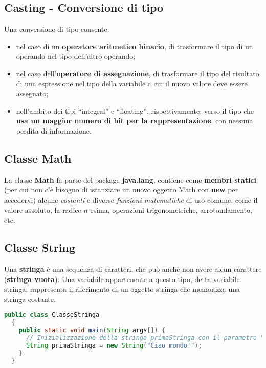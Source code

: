 \documentclass[a4paper]{extarticle}
\begin{document}
\subsection{Casting - Conversione di tipo}
Una conversione di tipo consente:
\begin{itemize}
  \item nel caso di un \textbf{operatore aritmetico binario}, di trasformare il tipo di un operando nel tipo dell’altro operando;
  \item nel caso dell’\textbf{operatore di assegnazione}, di trasformare il tipo del risultato di una espressione nel tipo della variabile a cui il nuovo valore deve essere assegnato;
  \item nell’ambito dei tipi “integral” e “floating”, rispettivamente, verso il tipo che \textbf{usa un maggior numero di bit per la rappresentazione}, con nessuna perdita di informazione.
\end{itemize}

\vspace{1em}
\subsection{Classe Math}
La classe \textbf{Math} fa parte del package \textbf{java.lang}, contiene come \textbf{membri statici} (per cui non c'è bisogno di istanziare un nuovo oggetto Math con \textbf{new} per accedervi) alcune \emph{costanti} e diverse \emph{funzioni matematiche} di uso comune, come il valore assoluto, la radice $n$-esima, operazioni trigonometriche, arrotondamento, etc.

\vspace{1em}
\subsection{Classe String}
Una \textbf{stringa} è una sequenza di caratteri, che può anche non avere alcun carattere (\textbf{stringa vuota}). Una variabile appartenente a questo tipo, detta variabile stringa, rappresenta il riferimento di un oggetto stringa che memorizza una stringa costante.

\vspace{1em}
\noindent
\begin{lstlisting}[language=Java, caption=Inizializzazione di una stringa in Java]
  public class ClasseStringa
  {
    public static void main(String args[]) {
      // Inizializzazione della stringa primaStringa con il parametro "Ciao mondo!"
      String primaStringa = new String("Ciao mondo!");
    }
  }
\end{lstlisting}
\vspace{1em}
\end{document}
